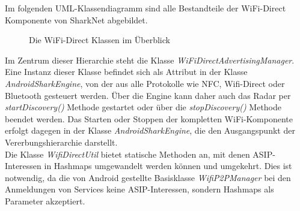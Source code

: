 Im folgenden UML-Klassendiagramm sind alle Bestandteile der WiFi-Direct Komponente von SharkNet abgebildet.
\begin{figure}[H]
	\centering
	\caption{Die WiFi-Direct Klassen im Überblick}
	\label{fig:wifiAll}
\end{figure}
\newpage
Im Zentrum dieser Hierarchie steht die Klasse \textit{WiFiDirectAdvertisingManager}. Eine Instanz dieser Klasse befindet sich als Attribut in der Klasse \textit{AndroidSharkEngine}, von der aus alle Protokolle wie NFC, Wifi-Direct oder Bluetooth gesteuert werden. Über die Engine kann daher auch das Radar per \textit{startDiscovery()} Methode gestartet oder über die \textit{stopDiscovery()} Methode beendet werden. Das Starten oder Stoppen der kompletten WiFi-Komponente erfolgt dagegen in der Klasse \textit{AndroidSharkEngine}, die den Ausgangspunkt der Vererbungshierarchie darstellt.
\\Die Klasse \textit{WifiDirectUtil} bietet statische Methoden an, mit denen ASIP-Interessen in Hashmaps umgewandelt werden können und umgekehrt. Dies ist notwendig, da die von Android gestellte Basisklasse \textit{WifiP2PManager} bei den Anmeldungen von Services keine ASIP-Interessen, sondern Hashmaps als Parameter akzeptiert.

